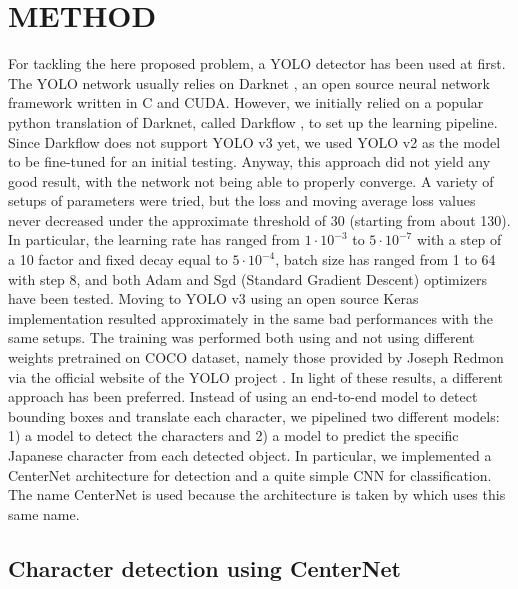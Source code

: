 \section{METHOD}
\label{sec:method}

For tackling the here proposed problem, a YOLO detector has been used at first. The YOLO network usually relies on Darknet \cite{darknet2018}, an open source neural network framework written in C and CUDA. However, we initially relied on a popular python translation of Darknet, called Darkflow \cite{thtrieu2016}, to set up the learning pipeline. Since Darkflow does not support YOLO v3 yet, we used YOLO v2 as the model to be fine-tuned for an initial testing. Anyway, this approach did not yield any good result, with the network not being able to properly converge. A variety of setups of parameters were tried, but the loss and moving average loss values never decreased under the approximate threshold of 30 (starting from about 130). In particular, the learning rate has ranged from $1 \cdot 10^{-3}$ to $5 \cdot 10^{-7}$ with a step of a 10 factor and fixed decay equal to $5 \cdot 10^{-4}$, batch size has ranged from 1 to 64 with step 8, and both Adam and Sgd (Standard Gradient Descent) optimizers have been tested. Moving to YOLO v3 using an open source Keras implementation \cite{experiencor2018} resulted approximately in the same bad performances with the same setups. The training was performed both using and not using different weights pretrained on COCO dataset, namely those provided by Joseph Redmon via the official website of the YOLO project \cite{yolo2018}. In light of these results, a different approach has been preferred. Instead of using an end-to-end model to detect bounding boxes and translate each character, we pipelined two different models: 1) a model to detect the characters and 2) a model to predict the specific Japanese character from each detected object. In particular, we implemented a CenterNet architecture for detection and a quite simple CNN for classification. The name CenterNet is used because the architecture is taken by \cite{Zhou2019-sd} which uses this same name.

\subsection{Character detection using CenterNet}
\label{ssec:charactercenternet}

